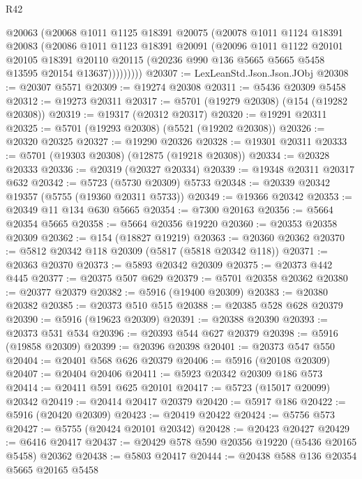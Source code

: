 \begin{lexlean}{R42}
\begin{coremodule}
            @20063
            (@20068
              @1011
              @1125
              @18391
              @20075
              (@20078
                @1011
                @1124
                @18391
                @20083
                (@20086
                  @1011
                  @1123
                  @18391
                  @20091
                  (@20096
                    @1011
                    @1122
                    @20101
                    @20105
                    @18391
                    @20110
                    @20115
                    (@20236 @990 @136 @5665 @5665 @5458 @13595 @20154 @13637)))))))))
@20307 := LexLeanStd.Json.Json.JObj
@20308 := @20307 @5571
@20309 := @19274 @20308
@20311 := @5436 @20309 @5458
@20312 := @19273 @20311
@20317 := @5701 (@19279 @20308) (@154 (@19282 @20308))
@20319 := @19317 (@20312 @20317)
@20320 := @19291 @20311
@20325 := @5701 (@19293 @20308) (@5521 (@19202 @20308))
@20326 := @20320 @20325
@20327 := @19290 @20326
@20328 := @19301 @20311
@20333 := @5701 (@19303 @20308) (@12875 (@19218 @20308))
@20334 := @20328 @20333
@20336 := @20319 (@20327 @20334)
@20339 := @19348 @20311 @20317 @632
@20342 := @5723 (@5730 @20309) @5733
@20348 := @20339 @20342 @19357 (@5755 (@19360 @20311 @5733))
@20349 := @19366 @20342
@20353 := @20349 @11 @134 @630 @5665
@20354 := @7300 @20163
@20356 := @5664 @20354 @5665
@20358 := @5664 @20356 @19220
@20360 := @20353 @20358 @20309
@20362 := @154 (@18827 @19219)
@20363 := @20360 @20362
@20370 := @5812 @20342 @118 @20309 (@5817 (@5818 @20342 @118))
@20371 := @20363 @20370
@20373 := @5893 @20342 @20309
@20375 := @20373 @442 @445
@20377 := @20375 @507 @629
@20379 := @5701 @20358 @20362
@20380 := @20377 @20379
@20382 := @5916 (@19400 @20309)
@20383 := @20380 @20382
@20385 := @20373 @510 @515
@20388 := @20385 @528 @628 @20379
@20390 := @5916 (@19623 @20309)
@20391 := @20388 @20390
@20393 := @20373 @531 @534
@20396 := @20393 @544 @627 @20379
@20398 := @5916 (@19858 @20309)
@20399 := @20396 @20398
@20401 := @20373 @547 @550
@20404 := @20401 @568 @626 @20379
@20406 := @5916 (@20108 @20309)
@20407 := @20404 @20406
@20411 := @5923 @20342 @20309 @186 @573
@20414 := @20411 @591 @625 @20101
@20417 := @5723 (@15017 @20099) @20342
@20419 := @20414 @20417 @20379
@20420 := @5917 @186
@20422 := @5916 (@20420 @20309)
@20423 := @20419 @20422
@20424 := @5756 @573
@20427 := @5755 (@20424 @20101 @20342)
@20428 := @20423 @20427
@20429 := @6416 @20417
@20437 := @20429 @578 @590 @20356 @19220 (@5436 @20165 @5458) @20362
@20438 := @5803 @20417
@20444 := @20438 @588 @136 @20354 @5665 @20165 @5458

\end{coremodule}
\end{lexlean}
